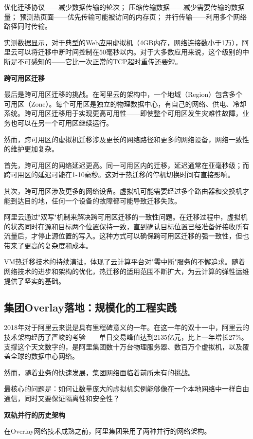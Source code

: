 优化迁移协议——减少数据传输的轮次；
压缩传输数据——减少需要传输的数据量；
预测热页面——优先传输可能被访问的内存页；
并行传输——利用多个网络路径同时传输。

实测数据显示，对于典型的Web应用虚拟机（4GB内存，网络连接数小于1万），阿里云可以将迁移中断时间控制在50毫秒以内。对于大多数应用来说，这个级别的中断是不可感知的——它比一次正常的TCP超时重传还要短。

\textbf{跨可用区迁移}

最后是跨可用区迁移的挑战。在阿里云的架构中，一个地域（Region）包含多个可用区（Zone）。每个可用区是独立的物理数据中心，有自己的网络、供电、冷却系统。跨可用区迁移用于实现更高可用性——即使整个可用区发生灾难性故障，业务也可以在另一个可用区继续运行。

然而，跨可用区的虚拟机迁移涉及更长的网络路径和更多的网络设备，网络一致性的维护更加复杂。

首先，跨可用区的网络延迟更高。同一可用区内的迁移，延迟通常在亚毫秒级；而跨可用区的延迟可能在1-10毫秒。这对于热迁移的停机切换时间有直接影响。

其次，跨可用区涉及更多的网络设备。虚拟机可能需要经过多个路由器和交换机才能到达目的地，任何一个设备的故障都可能导致迁移失败。

阿里云通过"双写"机制来解决跨可用区迁移的一致性问题。在迁移过程中，虚拟机的状态同时在源和目标两个位置保持一致，直到确认目标位置已经准备好接收所有流量后，才停止源位置的写入。这种方式可以确保跨可用区迁移的强一致性，但也带来了更高的复杂度和成本。

VM热迁移技术的持续演进，体现了云计算平台对"零中断"服务的不懈追求。随着网络技术的进步和架构的优化，热迁移的适用范围不断扩大，为云计算的弹性运维提供了坚实的基础。

\subsection{集团Overlay落地：规模化的工程实践}

2018年对于阿里云来说是具有里程碑意义的一年。在这一年的双十一中，阿里云的技术架构经历了严峻的考验——单日交易峰值达到2135亿元，比上一年增长27\%。支撑这个天文数字的，是阿里集团数十万台物理服务器、数百万个虚拟机，以及覆盖全球的数据中心网络。

然而，随着业务的快速发展，集团网络面临着前所未有的挑战。

最核心的问题是：如何让数量庞大的虚拟机实例能够像在一个本地网络中一样自由通信，同时又要保证隔离性和安全性？

\textbf{双轨并行的历史架构}

在Overlay网络技术成熟之前，阿里集团采用了两种并行的网络架构。


